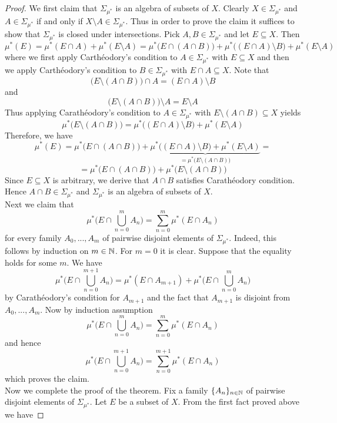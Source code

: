 \begin{proof}
    We first claim that $\Sigma_{\mu^*}$ is an algebra of subsets of $X$. Clearly $X \in \Sigma_{\mu^*}$ and $A \in \Sigma_{\mu^*}$ if and only if $X\setminus A \in \Sigma_{\mu^*}$. Thus in order to prove the claim it suffices to show that $\Sigma_{\mu^*}$ is closed under intersections. Pick $A,B\in \Sigma_{\mu^*}$ and let $E \subseteq X$. Then
    $$\mu^*(E) = \mu^*(E\cap A) + \mu^*(E\setminus A) = \mu^*\big(E\cap (A\cap B)\big) + \mu^*\big((E\cap A) \setminus B\big) + \mu^*(E\setminus A)$$
    where we first apply Carth{\'e}odory's condition to $A \in \Sigma_{\mu^*}$ with $E\subseteq X$ and then we apply Carth{\'e}odory's condition to $B\in \Sigma_{\mu^*}$ with $E\cap A\subseteq X$. Note that
    $$\big(E\setminus (A \cap B)\big)\cap A = (E\cap A) \setminus B$$
    and
    $$\big(E\setminus (A\cap B)\big)\setminus A = E\setminus A$$
    Thus applying Carath{\'e}odory's condition to $A\in \Sigma_{\mu^*}$ with $E\setminus (A\cap B)\subseteq X$ yields
    $$\mu^*\big(E\setminus (A\cap B)\big) = \mu^*\big((E\cap A) \setminus B\big) + \mu^*(E\setminus A)$$
    Therefore, we have
    $$\mu^*(E) = \mu^*\big(E\cap (A\cap B)\big) + \underbrace{\mu^*\big((E\cap A) \setminus B\big) + \mu^*(E\setminus A)}_{=\mu^*\big(E\setminus (A\cap B)\big)} = $$
    $$=\mu^*\big(E\cap (A\cap B)\big) + \mu^*\big(E\setminus (A\cap B)\big)$$
    Since $E\subseteq X$ is arbitrary, we derive that $A\cap B$ satisfies Carath{\'e}odory condition. Hence $A\cap B \in \Sigma_{\mu^*}$ and $\Sigma_{\mu^*}$ is an algebra of subsets of $X$.\\
    Next we claim that
    $$\mu^*\bigg(E\cap \bigcup_{n=0}^mA_n\bigg) = \sum_{n=0}^m\mu^*(E\cap A_n)$$
    for every family $A_0,...,A_m$ of pairwise disjoint elements of $\Sigma_{\mu^*}$. Indeed, this follows by induction on $m \in {\mathbb N}$. For $m = 0$ it is clear. Suppose that the equality holds for some $m$. We have
    $$\mu^*\bigg(E\cap \bigcup_{n=0}^{m+1}A_n\bigg) = \mu^*(E\cap A_{m+1}) + \mu^*\bigg(E\cap \bigcup_{n=0}^mA_n\bigg)
    $$
    by Carath{\'e}odory's condition for $A_{m+1}$ and the fact that $A_{m+1}$ is disjoint from $A_0,...,A_m$. Now by induction assumption
    $$\mu^*\bigg(E\cap \bigcup_{n=0}^mA_n\bigg) = \sum_{n=0}^m\mu^*(E\cap A_n)$$
    and hence
    $$\mu^*\bigg(E\cap \bigcup_{n=0}^{m+1}A_n\bigg) = \sum_{n=0}^{m+1}\mu^*(E\cap A_n)$$
    which proves the claim.\\
    Now we complete the proof of the theorem. Fix a family $\{A_n\}_{n\in {\mathbb N}}$ of pairwise disjoint elements of $\Sigma_{\mu^*}$. Let $E$ be a subset of $X$. From the first fact proved above we have

\end{proof}
